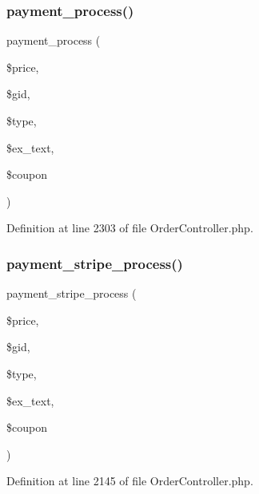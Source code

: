\subsubsection{\texorpdfstring{payment\_process()}{payment\_process()}}
{\footnotesize\ttfamily payment\+\_\+process (\begin{DoxyParamCaption}\item[{}]{\$price,  }\item[{}]{\$gid,  }\item[{}]{\$type,  }\item[{}]{\$ex\+\_\+text,  }\item[{}]{\$coupon }\end{DoxyParamCaption})}



Definition at line 2303 of file Order\+Controller.\+php.

\mbox{\label{class_responsive_1_1_http_1_1_controllers_1_1_order_controller_aaa3531883a947bece074bf3e9687b552}} 
\subsubsection{\texorpdfstring{payment\_stripe\_process()}{payment\_stripe\_process()}}
{\footnotesize\ttfamily payment\+\_\+stripe\+\_\+process (\begin{DoxyParamCaption}\item[{}]{\$price,  }\item[{}]{\$gid,  }\item[{}]{\$type,  }\item[{}]{\$ex\+\_\+text,  }\item[{}]{\$coupon }\end{DoxyParamCaption})}



Definition at line 2145 of file Order\+Controller.\+php.

\mbox{\label{class_responsive_1_1_http_1_1_controllers_1_1_order_controller_addb6aac1567fa6da7146944f30063322}} 
